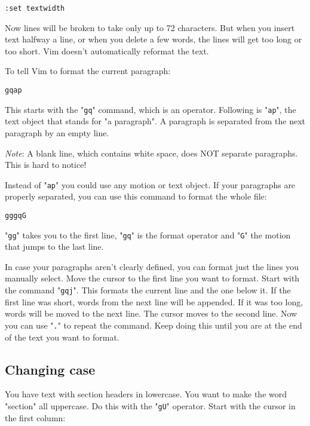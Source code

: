 \begin{Verbatim}[samepage=true]
 :set textwidth
\end{Verbatim}

Now lines will be broken to take only up to 72 characters.
But when you insert text halfway a line, or when you delete a few words, the lines will get too long or too short.
Vim doesn't automatically reformat the text.

To tell Vim to format the current paragraph:

\begin{Verbatim}[samepage=true]
 gqap
\end{Verbatim}

This starts with the "\texttt{gq}" command, which is an operator.
Following is "\texttt{ap}", the text object that stands for "a paragraph".
A paragraph is separated from the next paragraph by an empty line.

\emph{Note}:
A blank line, which contains white space, does NOT separate paragraphs.
This is hard to notice!

Instead of "\texttt{ap}" you could use any motion or text object.
If your paragraphs are properly separated, you can use this command to format the whole file:

\begin{Verbatim}[samepage=true]
 gggqG
\end{Verbatim}

"\texttt{gg}" takes you to the first line, "\texttt{gq}" is the format operator and "\texttt{G}" the motion that jumps to the last line.

In case your paragraphs aren't clearly defined, you can format just the lines you manually select.
Move the cursor to the first line you want to format.
Start with the command "\texttt{gqj}".
This formats the current line and the one below it.
If the first line was short, words from the next line will be appended.
If it was too long, words will be moved to the next line.
The cursor moves to the second line.
Now you can use "\texttt{.}" to repeat the command.
Keep doing this until you are at the end of the text you want to format.

\subsection{Changing case}
You have text with section headers in lowercase.
You want to make the word "section" all uppercase.
Do this with the "\texttt{gU}" operator.
Start with the cursor in the first column:

